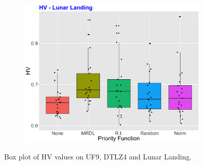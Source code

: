 \begin{figure}[!t]
\begin{subfigure}[b]{0.33\textwidth}
	\end{subfigure}
\begin{subfigure}[b]{0.33\textwidth}
	\centering
	\includegraphics[width=1\textwidth, height=1\textwidth]{images/moon_HV.png}
\end{subfigure}
	\caption{Box plot of HV values on UF9, DTLZ4 and Lunar Landing.}
		\label{HVS}
\end{figure}



